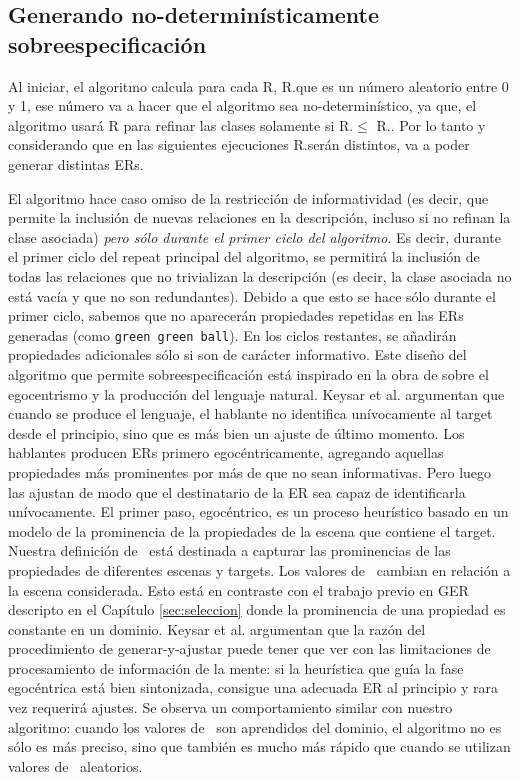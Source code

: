 \subsection{Generando no-determin\'isticamente sobreespecificaci\'on}
\label{sec:overspecification}

Al iniciar, el algoritmo calcula para cada R, R.\randomuse que es un n\'umero aleatorio entre 0 y 1, ese n\'umero va a hacer que el algoritmo sea no-determin\'istico, ya que, el algoritmo usar\'a R para refinar las clases solamente si 
R.\randomuse $\leq$ R.\puse. Por lo tanto y considerando que en las siguientes ejecuciones R.\randomuse ser\'an distintos, va a poder generar distintas ERs.

El algoritmo hace caso omiso de la restricci\'on de informatividad (es decir, que permite la inclusi\'on de nuevas relaciones
en la descripci\'on, incluso si no refinan la clase asociada) \emph{pero s\'olo durante el
primer ciclo del algoritmo}. Es decir, durante el primer ciclo del repeat principal del algoritmo, se permitir\'a la inclusi\'on de todas las relaciones que no trivializan la
descripci\'on (es decir, la clase asociada no est\'a vac\'{i}a y que no son redundantes). Debido a que esto se hace s\'olo durante
el primer ciclo, sabemos que no aparecer\'an propiedades repetidas en las ERs generadas (como \texttt{green green ball}).
En los ciclos restantes, se a\~nadir\'an propiedades adicionales s\'olo si son de car\'acter informativo.
Este dise\~no del algoritmo que permite sobreespecificaci\'on est\'a inspirado en la obra de \cite{keysar:Curr98} sobre el egocentrismo y la producci\'on del lenguaje natural. Keysar et al. argumentan que cuando se produce el lenguaje, el hablante no identifica un\'ivocamente al target desde el principio, sino que  
es m\'as bien un ajuste de \'ultimo momento. Los hablantes producen ERs primero egoc\'entricamente, agregando aquellas propiedades m\'as prominentes por m\'as de que no sean informativas. Pero luego las ajustan de modo que el destinatario de la ER sea capaz de identificarla un\'ivocamente. El primer paso, egoc\'entrico, es un proceso
heur\'istico basado en un modelo de la prominencia de la propiedades de la escena que contiene el target. Nuestra definici\'on de
\puse\ est\'a destinada a capturar las prominencias de las propiedades de diferentes escenas y targets. Los valores de \puse\
cambian en relaci\'on a la escena considerada. Esto est\'a en contraste con el trabajo previo en GER descripto en el Cap\'itulo \ref{sec:seleccion} donde
la prominencia de una propiedad es constante en un dominio. Keysar et al. argumentan que la raz\'on del procedimiento de 
generar-y-ajustar puede tener que ver con las limitaciones de procesamiento de informaci\'on de la
mente: si la heur\'istica que gu\'ia la fase egoc\'entrica est\'a bien sintonizada, consigue una adecuada ER al principio
y rara vez requerir\'a ajustes. Se observa un comportamiento similar
con nuestro algoritmo: cuando los valores de \puse\ son
aprendidos del dominio, el algoritmo no es
s\'olo es m\'as preciso, sino que tambi\'en es mucho m\'as r\'apido que cuando se utilizan valores de \puse\ aleatorios.  

